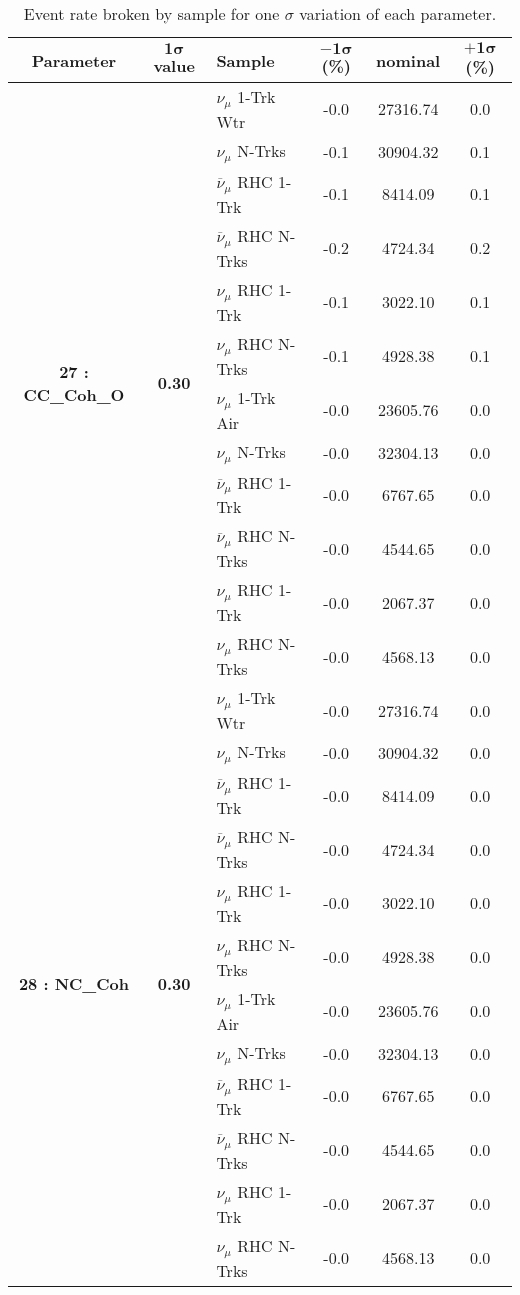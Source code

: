 \addtocounter{table}{-1}
\begin{table}[ht!]
\centering
\begin{tabular}{ c  c  l  c  c  c }
\midrule[1.3pt]
\textbf{Parameter} & \textbf{$\mathbf{1\sigma}$ value} & \textbf{Sample} & \textbf{$\mathbf{-1\sigma}$ (\%)}  &  \textbf{nominal}  &  \textbf{$\mathbf{+1\sigma}$ (\%)} \\
\midrule[1.3pt]
\multirow{12}{*}{\textbf{27 : CC\_Coh\_O}} & \multirow{12}{*}{\textbf{0.30}} & $\nu_\mu$ 1-Trk Wtr &   -0.0 &  27316.74 &   0.0 \\ 
 &  & $\nu_\mu$ N-Trks &   -0.1 &  30904.32 &   0.1 \\ 
 &  & $\overline{\nu}_\mu$ RHC 1-Trk &   -0.1 &  8414.09 &   0.1 \\ 
 &  & $\overline{\nu}_\mu$ RHC N-Trks &   -0.2 &  4724.34 &   0.2 \\ 
 &  & $\nu_\mu$ RHC 1-Trk &   -0.1 &  3022.10 &   0.1 \\ 
 &  & $\nu_\mu$ RHC N-Trks &   -0.1 &  4928.38 &   0.1 \\ 
 &  & $\nu_\mu$ 1-Trk Air &   -0.0 &  23605.76 &   0.0 \\ 
 &  & $\nu_\mu$ N-Trks &   -0.0 &  32304.13 &   0.0 \\ 
 &  & $\overline{\nu}_\mu$ RHC 1-Trk &   -0.0 &  6767.65 &   0.0 \\ 
 &  & $\overline{\nu}_\mu$ RHC N-Trks &   -0.0 &  4544.65 &   0.0 \\ 
 &  & $\nu_\mu$ RHC 1-Trk &   -0.0 &  2067.37 &   0.0 \\ 
 &  & $\nu_\mu$ RHC N-Trks &   -0.0 &  4568.13 &   0.0 \\ 
\midrule[1.3pt]
\multirow{12}{*}{\textbf{28 : NC\_Coh}} & \multirow{12}{*}{\textbf{0.30}} & $\nu_\mu$ 1-Trk Wtr &   -0.0 &  27316.74 &   0.0 \\ 
 &  & $\nu_\mu$ N-Trks &   -0.0 &  30904.32 &   0.0 \\ 
 &  & $\overline{\nu}_\mu$ RHC 1-Trk &   -0.0 &  8414.09 &   0.0 \\ 
 &  & $\overline{\nu}_\mu$ RHC N-Trks &   -0.0 &  4724.34 &   0.0 \\ 
 &  & $\nu_\mu$ RHC 1-Trk &   -0.0 &  3022.10 &   0.0 \\ 
 &  & $\nu_\mu$ RHC N-Trks &   -0.0 &  4928.38 &   0.0 \\ 
 &  & $\nu_\mu$ 1-Trk Air &   -0.0 &  23605.76 &   0.0 \\ 
 &  & $\nu_\mu$ N-Trks &   -0.0 &  32304.13 &   0.0 \\ 
 &  & $\overline{\nu}_\mu$ RHC 1-Trk &   -0.0 &  6767.65 &   0.0 \\ 
 &  & $\overline{\nu}_\mu$ RHC N-Trks &   -0.0 &  4544.65 &   0.0 \\ 
 &  & $\nu_\mu$ RHC 1-Trk &   -0.0 &  2067.37 &   0.0 \\ 
 &  & $\nu_\mu$ RHC N-Trks &   -0.0 &  4568.13 &   0.0 \\ 
\midrule[1.3pt]
\end{tabular}
\centering
\caption{Event rate broken by sample for one $\sigma$ variation of each parameter.}
\end{table}
